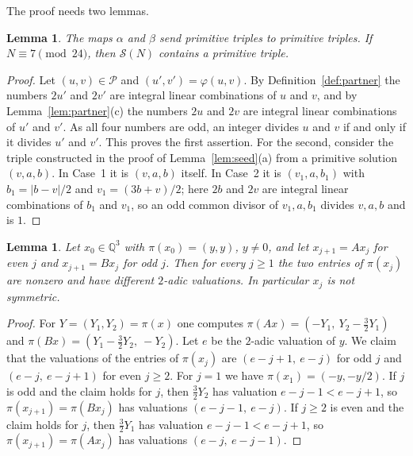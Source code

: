\documentclass[11pt]{amsart}
\newtheorem{lemma}[theorem]{Lemma}
\theoremstyle{definition}
\theoremstyle{remark}
\newcommand{\Q}{\mathbb{Q}}
\newcommand{\cS}{\mathcal{S}}
\newcommand{\cP}{\mathcal{P}}
\begin{document}
The proof needs two lemmas.

\begin{lemma}\label{lem:gcd}
The maps $\alpha$ and $\beta$ send primitive triples to primitive triples.
If $N\equiv 7\pmod{24}$, then $\cS(N)$ contains a primitive triple.
\end{lemma}

\begin{proof}
Let $(u,v)\in\cP$ and $(u',v')=\varphi(u,v)$. By Definition~\ref{def:partner} the numbers $2u'$ and $2v'$ are integral linear combinations of $u$ and $v$,
and by Lemma~\ref{lem:partner}(c) the numbers $2u$ and $2v$ are integral linear combinations of $u'$ and $v'$. As all four numbers are odd,
an integer divides $u$ and $v$ if and only if it divides $u'$ and $v'$. This proves the first assertion.
For the second, consider the triple constructed in the proof of Lemma~\ref{lem:seed}(a) from a primitive solution $(v,a,b)$.
In Case~1 it is $(v,a,b)$ itself. In Case~2 it is $(v_1,a,b_1)$ with $b_1=|b-v|/2$ and $v_1=(3b+v)/2$; here $2b$ and $2v$ are integral linear combinations of $b_1$ and $v_1$,
so an odd common divisor of $v_1,a,b_1$ divides $v,a,b$ and is $1$.
\end{proof}

\begin{lemma}\label{lem:val}
Let $x_0\in\Q^3$ with $\pi(x_0)=(y,y)$, $y\ne 0$, and let $x_{j+1}=Ax_j$ for even $j$ and $x_{j+1}=Bx_j$ for odd $j$.
Then for every $j\ge 1$ the two entries of $\pi(x_j)$ are nonzero and have different $2$-adic valuations. In particular $x_j$ is not symmetric.
\end{lemma}

\begin{proof}
For $Y=(Y_1,Y_2)=\pi(x)$ one computes $\pi(Ax)=(-Y_1,\ Y_2-\tfrac32Y_1)$ and $\pi(Bx)=(Y_1-\tfrac32Y_2,\ -Y_2)$.
Let $e$ be the $2$-adic valuation of $y$. We claim that the valuations of the entries of $\pi(x_j)$ are $(e-j+1,\ e-j)$ for odd $j$ and $(e-j,\ e-j+1)$ for even $j\ge 2$.
For $j=1$ we have $\pi(x_1)=(-y,-y/2)$. If $j$ is odd and the claim holds for $j$, then $\tfrac32Y_2$ has valuation $e-j-1<e-j+1$,
so $\pi(x_{j+1})=\pi(Bx_j)$ has valuations $(e-j-1,\ e-j)$. If $j\ge 2$ is even and the claim holds for $j$, then $\tfrac32Y_1$ has valuation $e-j-1<e-j+1$,
so $\pi(x_{j+1})=\pi(Ax_j)$ has valuations $(e-j,\ e-j-1)$.
\end{proof}
\end{document}
